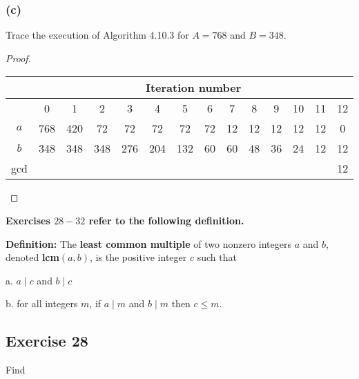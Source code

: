 \documentclass[14pt]{extarticle}
\newcommand{\cy}{\color{cyan}}
\begin{document}
\subsubsection{(c)}
Trace the execution of Algorithm 4.10.3 for $A = 768$ and $B = 348$.

\begin{proof}
    \begin{center}
        \begin{tabular}{|c|c|c|c|c|c|c|c|c|c|c|c|c|c|}
            \hline
                & \multicolumn{13}{c|}{{\bf \cy Iteration number}}                                                                  \\
            \hline
                & 0                                                & 1   & 2   & 3   & 4   & 5   & 6  & 7  & 8  & 9  & 10 & 11 & 12 \\
            \hline
            $a$ & 768                                              & 420 & 72  & 72  & 72  & 72  & 72 & 12 & 12 & 12 & 12 & 12 & 0  \\
            \hline
            $b$ & 348                                              & 348 & 348 & 276 & 204 & 132 & 60 & 60 & 48 & 36 & 24 & 12 & 12 \\
            \hline
            gcd &                                                  &     &     &     &     &     &    &    &    &    &    &    & 12 \\
            \hline
        \end{tabular}
    \end{center}
\end{proof}

{\bf \cy Exercises $28-32$ refer to the following definition.}

\begin{tcolorbox}[colframe=cyan]
    {\bf \cy Definition:} The {\bf least common multiple} of two nonzero integers $a$ and $b$, denoted {\bf lcm}$(a, b)$, is the positive integer $c$ such that

    a. $a \mid c$ and $b \mid c$

    b. for all integers $m$, if $a \mid m$ and $b \mid m$ then $c \leq m$.
\end{tcolorbox}

\subsection{Exercise 28}
Find
\end{document}
